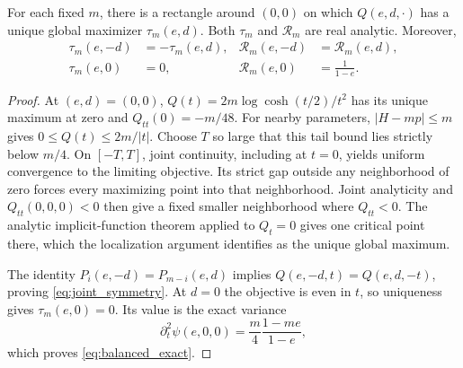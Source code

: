 \begin{lemma}\label{lem:joint_optimizer}
For each fixed $m$, there is a rectangle around $(0,0)$ on which $Q(e,d,\cdot)$ has a unique global maximizer $\tau_m(e,d)$. Both $\tau_m$ and $\mathcal R_m$ are real analytic. Moreover,
\begin{align}
 \tau_m(e,-d)&=-\tau_m(e,d),&
 \mathcal R_m(e,-d)&=\mathcal R_m(e,d),\label{eq:joint_symmetry}\\
 \tau_m(e,0)&=0,&
 \mathcal R_m(e,0)&=\frac1{1-e}.\label{eq:balanced_exact}
\end{align}
\end{lemma}
\begin{proof}
At $(e,d)=(0,0)$, $Q(t)=2m\log\cosh(t/2)/t^2$ has its unique maximum at zero and $Q_{tt}(0)=-m/48$. For nearby parameters, $|H-mp|\le m$ gives $0\le Q(t)\le2m/|t|$. Choose $T$ so large that this tail bound lies strictly below $m/4$. On $[-T,T]$, joint continuity, including at $t=0$, yields uniform convergence to the limiting objective. Its strict gap outside any neighborhood of zero forces every maximizing point into that neighborhood. Joint analyticity and $Q_{tt}(0,0,0)<0$ then give a fixed smaller neighborhood where $Q_{tt}<0$. The analytic implicit-function theorem applied to $Q_t=0$ gives one critical point there, which the localization argument identifies as the unique global maximum.

The identity $P_i(e,-d)=P_{m-i}(e,d)$ implies $Q(e,-d,t)=Q(e,d,-t)$, proving \eqref{eq:joint_symmetry}. At $d=0$ the objective is even in $t$, so uniqueness gives $\tau_m(e,0)=0$. Its value is the exact variance
\[
 \partial_t^2\psi(e,0,0)=\frac m4\frac{1-me}{1-e},
\]
which proves \eqref{eq:balanced_exact}.
\end{proof}

